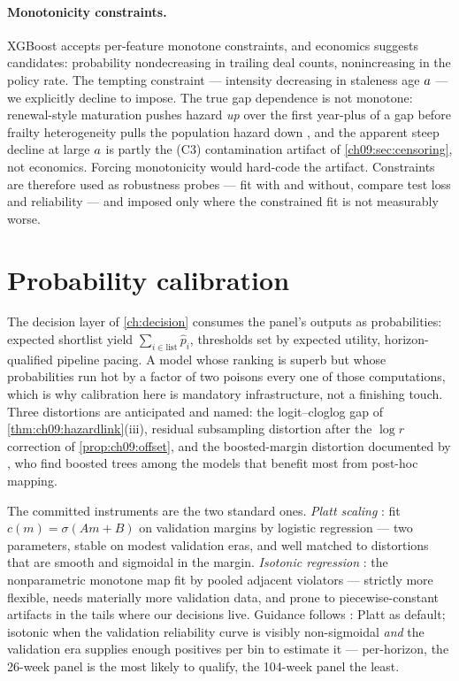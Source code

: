 \paragraph{Monotonicity constraints.} XGBoost accepts per-feature
monotone constraints, and economics suggests candidates: probability
nondecreasing in trailing deal counts, nonincreasing in the policy rate.
The tempting constraint --- intensity decreasing in staleness age
$a$ --- we explicitly decline to impose. The true gap dependence
is not monotone: renewal-style maturation pushes hazard \emph{up} over
the first year-plus of a gap before frailty heterogeneity pulls the
population hazard down \citep{vaupel1979,aalen2008}, and the apparent
steep decline at large $a$ is partly the (C3) contamination
artifact of \cref{ch09:sec:censoring}, not economics. Forcing
monotonicity would hard-code the artifact. Constraints are therefore
used as robustness probes --- fit with and without, compare test loss
and reliability --- and imposed only where the constrained fit is not
measurably worse.

\section{Probability calibration}\label{ch09:sec:calibration}

The decision layer of \cref{ch:decision} consumes the panel's outputs as
probabilities: expected shortlist yield $\sum_{i \in \text{list}}
\hat p_i$, thresholds set by expected utility, horizon-qualified
pipeline pacing. A model whose ranking is superb but whose probabilities
run hot by a factor of two poisons every one of those computations,
which is why calibration here is mandatory infrastructure, not a
finishing touch. Three distortions are anticipated and named: the
logit--cloglog gap of \cref{thm:ch09:hazardlink}(iii), residual
subsampling distortion after the $\log r$ correction of
\cref{prop:ch09:offset}, and the boosted-margin distortion documented by
\citet{niculescumizil2005}, who find boosted trees among the models that
benefit most from post-hoc mapping.

The committed instruments are the two standard ones. \emph{Platt
scaling} \citep{platt1999}: fit $c(m) = \sigma(Am + B)$ on validation
margins by logistic regression --- two parameters, stable on modest
validation eras, and well matched to distortions that are smooth and
sigmoidal in the margin. \emph{Isotonic regression}
\citep{zadroznyelkan2002}: the nonparametric monotone map fit by pooled
adjacent violators --- strictly more flexible, needs materially more
validation data, and prone to piecewise-constant artifacts in the tails
where our decisions live. Guidance follows
\citet{niculescumizil2005}: Platt as default; isotonic when the
validation reliability curve is visibly non-sigmoidal \emph{and} the
validation era supplies enough positives per bin to estimate it ---
per-horizon, the 26-week panel is the most likely to qualify, the
104-week panel the least.

